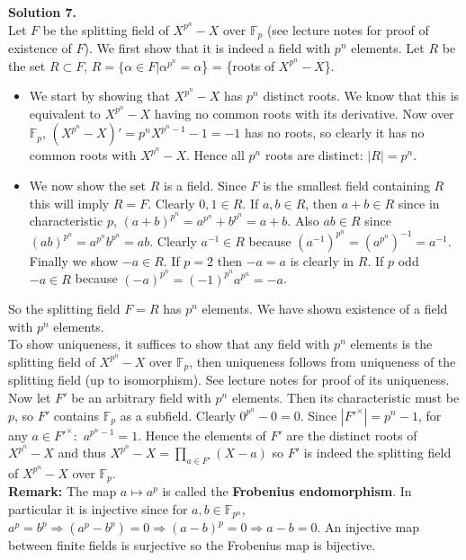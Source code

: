 \documentclass[12pt,a4paper]{article}
\begin{document}
\textbf{Solution 7.  }\\
Let $F$ be the splitting field of $X^{p^n}-X$ over $\mathbb{F}_p$ (see lecture notes for proof of existence of $F$). We first show that it is indeed a field with $p^n$ elements. Let $R$ be the set $R\subset F$, $R=\{\alpha\in F | \alpha^{p^n}=\alpha$\} = \{roots of $X^{p^n}-X$\}.
\begin{itemize}
\item We start by showing that $X^{p^n}-X$ has $p^n$ distinct roots. We know that this is equivalent to $X^{p^n}-X$ having no common roots with its derivative. Now over $\mathbb{F}_p$, $(X^{p^n}-X)'=p^nX^{p^n-1}-1= -1$ has no roots, so clearly it has no common roots with $X^{p^n}-X$. Hence all $p^n$ roots are distinct: $|R|=p^n$.
\item We now show the set $R$ is a field. Since $F$ is the smallest field containing $R$ this will imply $R=F$. Clearly $0, 1 \in R$. If $a, b \in R$, then $a+b \in R$ since in characteristic $p$, $(a+b)^{p^n}=a^{p^n}+b^{p^n}=a+b$. Also $ab\in R$ since  $(ab)^{p^n}=a^{p^n}b^{p^n}=ab$. Clearly $a^{-1} \in R$ because $(a^{-1})^{p^n}=(a^{p^n})^{-1}=a^{-1}$. Finally we show $-a\in R$. If $p=2$ then $-a=a$ is clearly in $R$. If $p$ odd $-a \in R$ because $(-a)^{p^n}=(-1)^{p^n}a^{p^n}=-a$.
\end{itemize}
So the splitting field $F=R$ has $p^n$ elements. We have shown existence of a field with $p^n$ elements.\\
To show uniqueness, it suffices to show that any field with $p^n$ elements is the splitting field of $X^{p^n}-X$ over $\mathbb{F}_p$, then uniqueness follows from uniqueness of the splitting field (up to isomorphism). See lecture notes for proof of its uniqueness.\\
Now let $F'$ be an arbitrary field with $p^n$ elements. Then its characteristic must be $p$, so $F'$ contains $\mathbb{F}_p$ as a subfield. 
Clearly $0^{p^n}-0=0$. Since $|F'^{\times}|=p^n-1$, for any $a \in F'^{\times}:$ $a^{p^n-1}=1$. Hence the elements of $F'$ are the distinct roots of $X^{p^n}-X$ and thus $X^{p^n}-X=\prod_{a\in F'} (X-a)$ so $F'$ is indeed the splitting field of $X^{p^n}-X$ over $\mathbb{F}_p$. \\
\textbf{Remark: } The map $a \mapsto a^p$ is called the \textbf{Frobenius endomorphism}. In particular it is injective since for $a,b \in \mathbb{F}_{p^n}$, $a^p=b^p \Rightarrow (a^p-b^p)=0 \Rightarrow (a-b)^p=0 \Rightarrow a-b=0$. An injective map between finite fields is surjective so the Frobenius map is bijective.   
\\
\end{document}

